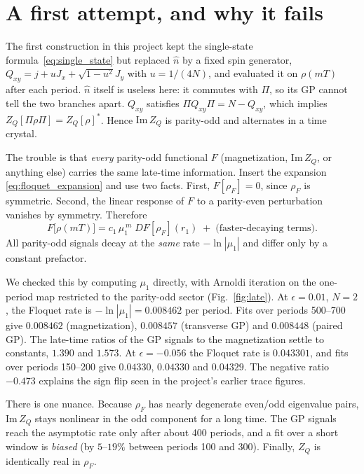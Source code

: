 \documentclass[11pt,a4paper]{article}
\begin{document}
\section{A first attempt, and why it fails}\label{sec:fail}

The first construction in this project kept the single-state formula~\eqref{eq:single_state}
but replaced $\hat n$ by a fixed spin generator,
$Q_{xy}=j+uJ_x+\sqrt{1-u^2}J_y$ with $u=1/(4N)$, and evaluated it on $\rho(mT)$ after each
period. $\hat n$ itself is useless here: it commutes with $\Pi$, so its GP cannot tell the two
branches apart. $Q_{xy}$ satisfies $\Pi Q_{xy}\Pi=N-Q_{xy}$, which implies
$Z_Q[\Pi\rho\Pi]=Z_Q[\rho]^*$. Hence $\mathrm{Im}\,Z_Q$ is parity-odd and alternates in a time
crystal.

The trouble is that \emph{every} parity-odd functional $F$ (magnetization, $\mathrm{Im}\,Z_Q$, or
anything else) carries the same late-time information. Insert the expansion
\eqref{eq:floquet_expansion} and use two facts. First, $F[\rho_F]=0$, since $\rho_F$ is
symmetric. Second, the linear response of $F$ to a parity-even perturbation vanishes by
symmetry. Therefore
\begin{equation}
F\big[\rho(mT)\big]=c_1\,\mu_1^{\,m}\;DF[\rho_F](r_1)\;+\;\text{(faster-decaying terms)} .
\label{eq:odd_functional}
\end{equation}
All parity-odd signals decay at the \emph{same} rate $-\ln|\mu_1|$ and differ only by a constant
prefactor.

We checked this by computing $\mu_1$ directly, with Arnoldi iteration on the one-period map
restricted to the parity-odd sector (Fig.~\ref{fig:late}). At $\epsilon=0.01$, $N=2$, the
Floquet rate is $-\ln|\mu_1|=0.008462$ per period. Fits over periods 500–700 give $0.008462$
(magnetization), $0.008457$ (transverse GP) and $0.008448$ (paired GP). The late-time ratios of
the GP signals to the magnetization settle to constants, $1.390$ and $1.573$. At
$\epsilon=-0.056$ the Floquet rate is $0.043301$, and fits over periods 150–200 give $0.04330$,
$0.04330$ and $0.04329$. The negative ratio $-0.473$ explains the sign flip seen in the project's
earlier trace figures.

There is one nuance. Because $\rho_F$ has nearly degenerate even/odd eigenvalue pairs,
$\mathrm{Im}\,Z_Q$ stays nonlinear in the odd component for a long time. The GP signals reach
the asymptotic rate only after about 400 periods, and a fit over a short window is \emph{biased}
(by $5$–$19\%$ between periods 100 and 300). Finally, $Z_Q$ is identically real in $\rho_F$.
\end{document}
